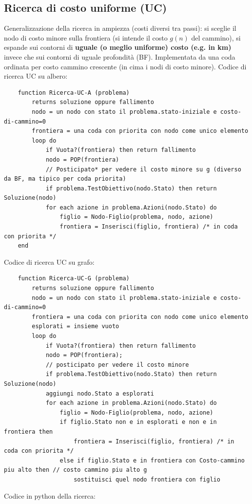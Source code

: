 \subsection{Ricerca di costo uniforme (UC)}
Generalizzazione della ricerca in ampiezza (costi diversi tra passi): si sceglie il
nodo di costo minore sulla frontiera (si intende il costo $g(n)$ del cammino), si espande sui 
contorni di \textbf{uguale (o meglio uniforme) costo (e.g. in km)} invece che sui
contorni di uguale profondità (BF).
Implementata da una coda ordinata per costo cammino crescente (in cima i nodi di costo minore).
Codice di ricerca UC su albero:
\begin{lstlisting}
	function Ricerca-UC-A (problema)
		returns soluzione oppure fallimento
		nodo = un nodo con stato il problema.stato-iniziale e costo-di-cammino=0
		frontiera = una coda con priorita con nodo come unico elemento
		loop do
			if Vuota?(frontiera) then return fallimento
			nodo = POP(frontiera)
			// Posticipato* per vedere il costo minore su g (diverso da BF, ma tipico per coda priorita)
			if problema.TestObiettivo(nodo.Stato) then return Soluzione(nodo)
			for each azione in problema.Azioni(nodo.Stato) do
				figlio = Nodo-Figlio(problema, nodo, azione)
				frontiera = Inserisci(figlio, frontiera) /* in coda con priorita */
	end
\end{lstlisting}
Codice di ricerca UC su grafo:
\begin{lstlisting}
	function Ricerca-UC-G (problema)
		returns soluzione oppure fallimento
		nodo = un nodo con stato il problema.stato-iniziale e costo-di-cammino=0
		frontiera = una coda con priorita con nodo come unico elemento
		esplorati = insieme vuoto
		loop do
			if Vuota?(frontiera) then return fallimento
			nodo = POP(frontiera);
			// posticipato per vedere il costo minore
			if problema.TestObiettivo(nodo.Stato) then return Soluzione(nodo)
			aggiungi nodo.Stato a esplorati
			for each azione in problema.Azioni(nodo.Stato) do
				figlio = Nodo-Figlio(problema, nodo, azione)
				if figlio.Stato non e in esplorati e non e in frontiera then
					frontiera = Inserisci(figlio, frontiera) /* in coda con priorita */
				else if figlio.Stato e in frontiera con Costo-cammino piu alto then // costo cammino piu alto g
					sostituisci quel nodo frontiera con figlio
\end{lstlisting}
Codice in python della ricerca:
